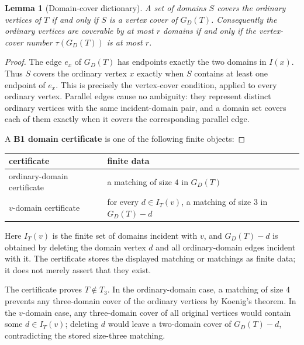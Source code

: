 \documentclass[11pt]{amsart}
\newtheorem{lemma}[theorem]{Lemma}
\theoremstyle{definition}
\begin{document}
\begin{lemma}[Domain-cover dictionary]
A set of domains \(S\) covers the ordinary vertices of \(T\) if and only if \(S\) is a vertex cover of \(G_D(T)\). Consequently the ordinary vertices are coverable by at most \(r\) domains if and only if the vertex-cover number \(\tau(G_D(T))\) is at most \(r\).

\end{lemma}
\begin{proof}
The edge \(e_x\) of \(G_D(T)\) has endpoints exactly the two domains in
\(I(x)\). Thus \(S\) covers the ordinary vertex \(x\) exactly when \(S\) contains at
least one endpoint of \(e_x\). This is precisely the vertex-cover condition,
applied to every ordinary vertex. Parallel edges cause no ambiguity: they
represent distinct ordinary vertices with the same incident-domain pair, and a
domain set covers each of them exactly when it covers the corresponding parallel
edge.

A \textbf{B1 domain certificate} is one of the following finite objects:

\end{proof}
\begin{center}
\begin{tabular}{p{}p{}}
certificate & finite data \\ \hline
ordinary-domain certificate & a matching of size \(4\) in \(G_D(T)\) \\
\(v\)-domain certificate & for every \(d\in I_T(v)\), a matching of size \(3\) in \(G_D(T)-d\) \\
\end{tabular}
\end{center}

Here \(I_T(v)\) is the finite set of domains incident with \(v\), and \(G_D(T)-d\) is
obtained by deleting the domain vertex \(d\) and all ordinary-domain edges
incident with it. The certificate stores the displayed matching or matchings as
finite data; it does not merely assert that they exist.

The certificate proves \(T\notin T_3\). In the ordinary-domain case, a matching of
size \(4\) prevents any three-domain cover of the ordinary vertices by Koenig's
theorem. In the \(v\)-domain case, any three-domain cover of all original vertices
would contain some \(d\in I_T(v)\); deleting \(d\) would leave a two-domain cover of
\(G_D(T)-d\), contradicting the stored size-three matching.
\end{document}
